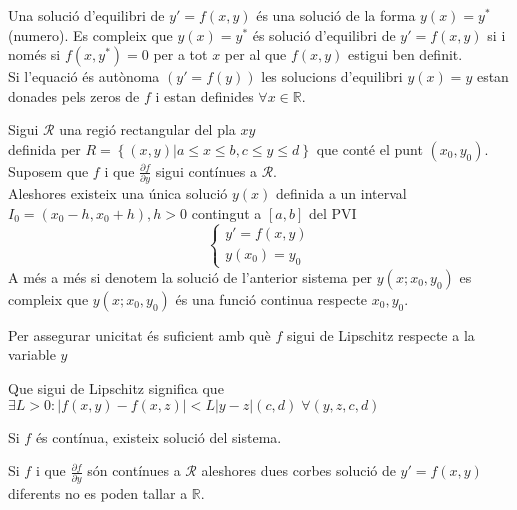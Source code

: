 \documentclass[../main.tex]{subfiles}
\begin{document}
Una solució d'equilibri de $y' = f(x, y)$ és una solució de la forma $y(x) = y^*$ (numero). Es
compleix que $y(x) = y^*$ és solució d'equilibri de $y' = f(x, y)$ si i només si $f(x, y^*) = 0$ per
a tot $x$ per al que $f(x, y)$ estigui ben definit.\\
Si l'equació és autònoma $\left(y' = f(y)\right)$ les solucions d'equilibri $y(x) = y$ estan donades pels zeros
de $f$ i estan definides $\forall x \in \mathbb{R}$.
\begin{teorema}
    Sigui $\mathcal{R}$ una regió rectangular del pla $xy$\\definida per $R = \left\{(x, y) | a \leq x \leq b, c \leq y \leq d\right\}$
    que conté el punt $(x_0, y_0)$.\\
    Suposem que $f$ i que $\frac{\partial f}{\partial y}$ sigui contínues a $\mathcal{R}$.\\
    Aleshores existeix una única solució $y(x)$ definida a un interval $I_0 = (x_0-h, x_0+h), h > 0$ contingut a $\left[a, b\right]$ del PVI
    \begin{displaymath}
        \begin{cases}
            y' = f(x,y)\\
            y(x_0) = y_0
        \end{cases}
    \end{displaymath}
    A més a més si denotem la solució de l'anterior sistema per $y(x; x_0, y_0)$ es compleix que $y(x; x_0, y_0)$
    és una funció continua respecte $x_0, y_0$.
    \begin{obs}
        Per assegurar unicitat és suficient amb què $f$ sigui de Lipschitz respecte a la variable $y$
        \begin{obs}
            Que sigui de Lipschitz significa que $\exists L > 0: \left\lvert f(x,y) - f(x,z)\right\rvert < L \left\lvert y-z\right\rvert(c, d)\;\forall(y, z, c, d)$
        \end{obs}
    \end{obs}
\end{teorema}
\begin{teorema}[de Peano]
    Si $f$ és contínua, existeix solució del sistema.
\end{teorema}
\begin{teorema}
    Si $f$ i que $\frac{\partial f}{\partial y}$ són contínues a $\mathcal{R}$ aleshores dues corbes
    solució de $y' = f(x,y)$ diferents no es poden tallar a $\mathbb{R}$.
\end{teorema}
\end{document}
